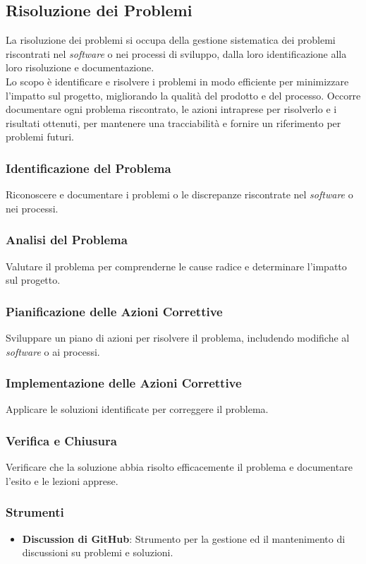 \subsection{Risoluzione dei Problemi}
La risoluzione dei problemi si occupa della gestione sistematica dei problemi
riscontrati nel \textit{software} o nei processi di sviluppo, dalla loro
identificazione alla loro risoluzione e documentazione.\\
Lo scopo è identificare e risolvere i problemi in modo efficiente per minimizzare l'impatto
sul progetto, migliorando la qualità del prodotto e del processo.
Occorre documentare ogni problema riscontrato, le azioni intraprese per risolverlo e i
risultati ottenuti, per mantenere una tracciabilità e fornire un riferimento
per problemi futuri.

\subsubsection{Identificazione del Problema} 
Riconoscere e documentare i
	  problemi o le discrepanze riscontrate nel \textit{software} o nei
	  processi.

\subsubsection{Analisi del Problema} 
Valutare il problema per comprenderne
	  le cause radice e determinare l'impatto sul progetto.

\subsubsection{Pianificazione delle Azioni Correttive} 
Sviluppare un piano
	  di azioni per risolvere il problema, includendo modifiche al
	  \textit{software} o ai processi.

\subsubsection{Implementazione delle Azioni Correttive} 
Applicare le
	  soluzioni identificate per correggere il problema.

\subsubsection{Verifica e Chiusura} 
Verificare che la soluzione abbia
	  risolto efficacemente il problema e documentare l'esito e le lezioni
	  apprese.

\subsubsection{Strumenti}
\begin{itemize}
	\item \textbf{Discussion di GitHub\g}: Strumento per la gestione ed
	      il mantenimento di discussioni su problemi e soluzioni.
\end{itemize}
